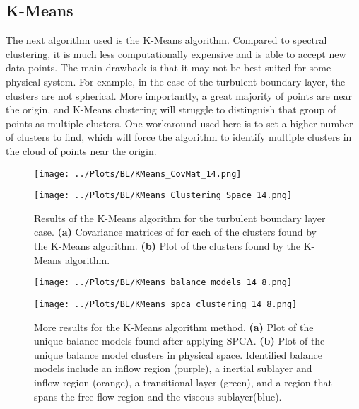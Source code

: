 \documentclass[12pt]{report} %
\begin{document}
\subsection{K-Means}

The next algorithm used is the K-Means algorithm. Compared to spectral clustering, it is much less computationally expensive and is able to accept new data points. The main drawback is that it may not be best suited for some physical system. For example, in the case of the turbulent boundary layer, the clusters are not spherical. More importantly, a great majority of points are near the origin, and K-Means clustering will struggle to distinguish that group of points as multiple clusters. One workaround used here is to set a higher number of clusters to find, which will force the algorithm to identify multiple clusters in the cloud of points near the origin.

\begin{figure}[htbp]
  \centering
  \begin{minipage}{0.9\textwidth}
    \centering
    \texttt{[image: ../Plots/BL/KMeans\_CovMat\_14.png]}
    \subcaption{}
  \end{minipage}

  \begin{minipage}{0.8\textwidth}
    \centering
    \texttt{[image: ../Plots/BL/KMeans\_Clustering\_Space\_14.png]}
    \subcaption{}
  \end{minipage}

  \caption{Results of the K-Means algorithm for the turbulent boundary layer case. \textbf{(a)} Covariance matrices of for each of the clusters found by the K-Means algorithm. \textbf{(b)} Plot of the clusters found by the K-Means algorithm.}
  \label{fig:KMeans_results_1}
\end{figure}

\begin{figure}[htbp]
  \centering
  \begin{minipage}[b]{0.6\textwidth}
      \centering
      \texttt{[image: ../Plots/BL/KMeans\_balance\_models\_14\_8.png]}
      \subcaption{}
  \end{minipage}

  \begin{minipage}[b]{0.6\textwidth}
      \centering
      \texttt{[image: ../Plots/BL/KMeans\_spca\_clustering\_14\_8.png]}
      \subcaption{}
  \end{minipage}

  \caption{More results for the K-Means algorithm method. \textbf{(a)} Plot of the unique balance models found after applying SPCA. \textbf{(b)} Plot of the unique balance model clusters in physical space. Identified balance models include an inflow region (purple), a inertial sublayer and inflow region (orange), a transitional layer (green), and a region that spans the free-flow region and the viscous sublayer(blue).}
  \label{fig:KMeans_results_2}
\end{figure}
\end{document}
